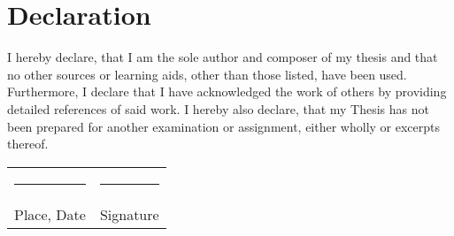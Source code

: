
\chapter*{Declaration}

I hereby declare, that I am the sole author and composer of my thesis and that no other sources or learning aids, other than those listed, have been used. Furthermore, I declare that I have acknowledged the work of others by providing detailed references of said work.  \newline
I hereby also declare, that my Thesis has not been prepared for another examination
or assignment, either wholly or excerpts thereof.
\\[3\normalbaselineskip]
\begin{tabular}{p{} l}
  \rule{\textwidth/3}{0.4pt}   &   \rule{\textwidth/3}{0.4pt} \\
  Place, Date                  &   Signature
\end{tabular}